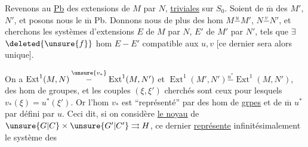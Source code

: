 Revenons au \uline{Pb} des extensions de $M$ par $N$,
\uline{triviales} sur $S_0$. Soient de $\overline{\mathrm m}$ des $M'$, $N'$, et
posons nous le $\overline{\mathrm m}$ Pb. Donnons nous de plus des hom
$M\overset{u}{-}M'$, $N\overset{v}{-}N'$, et cherchons les
systèmes d'extensions $E$ de $M$ par $N$, $E'$ de $M'$ par $N'$,
 tels que $\exists$
$\deleted{\unsure{f}}$ hom $E-E'$ compatible aux $u,v$
[ce dernier sera alors unique].

On a $\operatorname{Ext}^1(M,N)\overset{\unsure{v_*}}{-}
\operatorname{Ext}^1(M,N')$ et
$\operatorname{Ext}^1(M',N')\overset{u^*}{-}\operatorname{Ext}^1(M,N')$,
des hom de groupes, 
et les couples $(\xi,\xi')$ cherchés sont ceux pour lesquels
$v_*(\xi)=u^*(\xi')$. Or l'hom $v_*$ est
``représenté'' par des hom de \uline{grpes}
et de $\overline{\mathrm m}$ $u^*$ par
défini par $u$. Ceci dit, si on considère
\uline{le noyau}  de 
$\unsure{G|C}\times\unsure{G'|C'}\rightrightarrows H$,
 ce dernier
\uline{représente} infinitésimalement le système des
